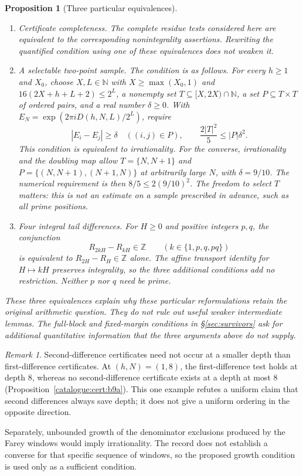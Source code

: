 \documentclass[11pt]{article}
\theoremstyle{plain}
\newtheorem{prop}[thm]{Proposition}
\theoremstyle{definition}
\theoremstyle{remark}
\newtheorem{rem}[thm]{Remark}
\newcommand{\N}{\mathbb{N}}
\newcommand{\Z}{\mathbb{Z}}
\begin{document}
\begin{prop}[Three particular equivalences]
\label{prop:b2}
\begin{enumerate}[label=(\alph*),leftmargin=*]
\item \emph{Certificate completeness.} The complete residue tests considered here are
  equivalent to the corresponding nonintegrality assertions. Rewriting the
  quantified condition using one of these equivalences does not weaken it.
\item \emph{A selectable two-point sample.} The condition is as follows.
  For every $h\ge1$ and $X_0$, choose $X,L\in\N$ with
  $X\ge\max(X_0,1)$ and $16(2X+h+L+2)\le2^L$, a nonempty set
  $T\subseteq[X,2X)\cap\N$, a set $P\subseteq T\times T$ of ordered
  pairs, and a real number $\delta\ge0$. With
  $E_N=\exp(2\pi iD(h,N,L)/2^L)$, require
  \[
   |E_i-E_j|\ge\delta\quad((i,j)\in P),\qquad
   \frac{2|T|^2}{5}\le |P|\delta^2.
  \]
  This condition is equivalent to irrationality. For the converse,
  irrationality and the doubling map allow
  $T=\{N,N+1\}$ and $P=\{(N,N+1),(N+1,N)\}$ at arbitrarily large $N$,
  with $\delta=9/10$. The numerical requirement is then
  $8/5\le2(9/10)^2$. The freedom to select $T$ matters: this is not an
  estimate on a sample prescribed in advance, such as all prime positions.

\item \emph{Four integral tail differences.} For $H\ge0$ and positive
  integers $p,q$, the conjunction
  \[
   R_{2kH}-R_{kH}\in\Z\qquad(k\in\{1,p,q,pq\})
  \]
  is equivalent to $R_{2H}-R_H\in\Z$ alone. The affine transport identity
  for $H\mapsto kH$ preserves integrality, so the three additional
  conditions add no restriction. Neither $p$ nor $q$ need be prime.
\end{enumerate}
These three equivalences explain why these particular reformulations
retain the original arithmetic question. They do not rule out useful weaker
intermediate lemmas. The full-block and fixed-margin conditions in
\S\ref{sec:survivors} ask for additional quantitative information that the
three arguments above do not supply.
\end{prop}

\begin{rem}
Second-difference certificates need not occur at a smaller depth than
first-difference certificates. At $(h,N)=(1,8)$, the first-difference test
holds at depth $8$, whereas no second-difference certificate exists at a
depth at most $8$ (Proposition~\ref{catalogue:cert:b9a}). This one
example refutes a uniform claim that second differences always save depth;
it does not give a uniform ordering in the opposite direction.

Separately, unbounded growth of the denominator exclusions produced by the
Farey windows would imply irrationality. The record does not establish a
converse for that specific sequence of windows, so the proposed growth
condition is used only as a sufficient condition.
\end{rem}
\end{document}
